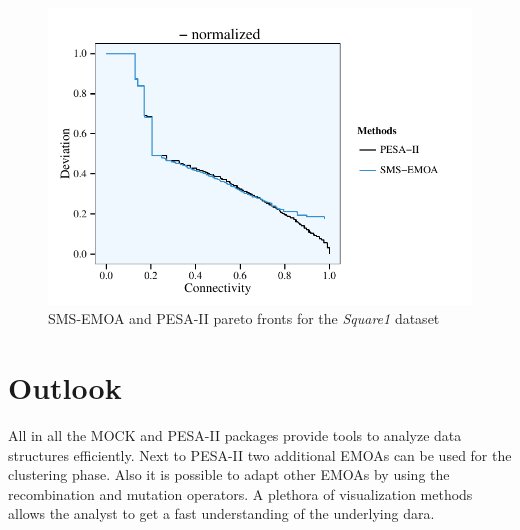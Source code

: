 \documentclass[parskip=half,DIV=14]{scrartcl}\usepackage[]{graphicx}\usepackage[]{color}
\makeatletter
\def\maxwidth{ %
  \ifdim\Gin@nat@width>\linewidth
    \linewidth
  \else
    \Gin@nat@width
  \fi
}
\newenvironment{knitrout}{}{} %
\makeatother
\begin{document}
\begin{figure}
\begin{center}
\begin{knitrout}
\color{fgcolor}

{\centering \includegraphics[width=\maxwidth]{figures/plots-printMultiple-1} 

}



\end{knitrout}
\caption{SMS-EMOA and PESA-II pareto fronts for the \textit{Square1} dataset}
\label{fig:multiple}
\end{center}
\end{figure}


\section{Outlook}
All in all the MOCK and PESA-II packages provide tools to analyze data structures efficiently. Next to PESA-II two additional EMOAs can be used for the clustering phase. Also it is possible to adapt other EMOAs by using the  recombination and mutation operators. A plethora of visualization methods allows the analyst to get a fast understanding of the underlying dara.
\end{document}
